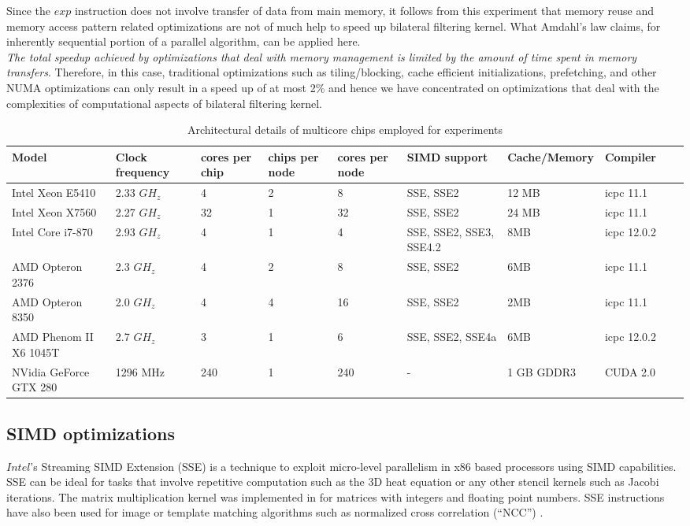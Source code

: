 \documentclass{IEEEtran}
\begin{document}
Since the $exp$ instruction does not involve transfer of data from main memory, it follows from this experiment that memory reuse and memory access pattern related optimizations are not of much help to speed up bilateral filtering kernel. What Amdahl's law claims, for inherently sequential portion of a parallel algorithm, can be applied here. \\ \textit{The total speedup achieved by optimizations that deal with memory management is limited by the amount of time spent in memory transfers}. Therefore, in this case, traditional optimizations such as tiling/blocking, cache efficient initializations, prefetching, and other NUMA optimizations can only result in a speed up of at most 2\% and hence we have concentrated on optimizations that deal with the complexities of computational aspects of bilateral filtering kernel.

\begin{table}[t!]
\begin{tabular}{|l|p{1.2cm}|p{0.8cm}|p{0.8cm}|p{0.8cm}|p{3.5cm}|l|p{2cm}|l|p{0.9cm}|}
\hline 
\textbf{Model}  & \textbf{Clock frequency}  & \textbf{cores per chip}  & \textbf{chips per node}  & \textbf{cores per node}  & \textbf{SIMD support}  & \textbf{Cache/Memory}  & Compiler\\
\hline 
Intel Xeon E5410  & 2.33 $GH_z$  & 4  & 2  & 8  & SSE, SSE2  & 12 MB  & icpc 11.1\\
\hline 
Intel Xeon X7560  & 2.27 $GH_z$  & 32  & 1  & 32  & SSE, SSE2  & 24 MB & icpc 11.1\\
\hline 
Intel Core i7-870  & 2.93 $GH_z$  & 4  & 1  & 4  & SSE, SSE2, SSE3, SSE4.2  & 8MB & icpc 12.0.2\\
\hline 
AMD Opteron 2376  & 2.3 $GH_z$  & 4  & 2  & 8  & SSE, SSE2  & 6MB  & icpc 11.1\\
\hline 
AMD Opteron 8350  & 2.0 $GH_z$  & 4  & 4  & 16  & SSE, SSE2  & 2MB  & icpc 11.1 \\
\hline 
AMD Phenom II X6 1045T  & 2.7 $GH_z$  & 3  & 1  & 6  & SSE, SSE2, SSE4a  & 6MB  & icpc 12.0.2 \\
\hline 
NVidia GeForce GTX 280 & 1296 MHz & 240 & 1 & 240 & - & 1 GB GDDR3 & CUDA 2.0\\
\hline
\end{tabular}
\caption{Architectural details of multicore chips employed for experiments}
\label{tab:archs} 
\end{table}


\subsection{SIMD optimizations}
\label{sub:SIMD1} 
$Intel$'s Streaming SIMD Extension (SSE) is a technique to exploit micro-level parallelism in x86 based processors using SIMD capabilities. SSE can be ideal for tasks that involve repetitive computation such as the 3D heat equation or any other stencil kernels such as Jacobi iterations\cite{kdatta2008}. The matrix multiplication kernel was implemented in \cite{matrix-multi,MatrixMultiFloating} for matrices with integers and floating point numbers. SSE instructions have also been used for image or template matching algorithms such as normalized cross correlation (``NCC'') \cite{NCCmatching}.
\end{document}
